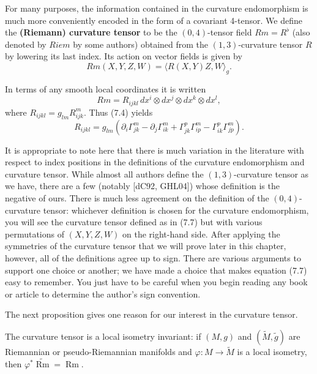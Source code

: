 For many purposes, the information contained in the curvature endomorphism is much more conveniently encoded in the form of a covariant 4-tensor. We define the \textbf{(Riemann) curvature tensor} to be the $(0,4)$-tensor field $Rm = R^\flat$ (also denoted by $Riem$ by some authors) obtained from the $(1,3)$-curvature tensor $R$ by lowering its last index. Its action on vector fields is given by
\begin{equation}
 Rm(X,Y,Z,W) = \langle R(X,Y)Z, W \rangle_g. \tag{7.7} 
\end{equation}

In terms of any smooth local coordinates it is written
\[ Rm = R_{ijkl} \, dx^i \otimes dx^j \otimes dx^k \otimes dx^l, \]
where $R_{ijkl} = g_{lm}R_{ijk}^m$. Thus (7.4) yields
\begin{equation}
 R_{ijkl} = g_{lm}(\partial_i \Gamma_{jk}^m - \partial_j \Gamma_{ik}^m + \Gamma_{jk}^p\Gamma_{ip}^m - \Gamma_{ik}^p\Gamma_{jp}^m). \tag{7.8} 
\end{equation}

It is appropriate to note here that there is much variation in the literature with respect to index positions in the definitions of the curvature endomorphism and curvature tensor. While almost all authors define the $(1,3)$-curvature tensor as we have, there are a few (notably [dC92, GHL04]) whose definition is the negative of ours. There is much less agreement on the definition of the $(0,4)$-curvature tensor: whichever definition is chosen for the curvature endomorphism, you will see the curvature tensor defined as in (7.7) but with various permutations of $(X,Y,Z,W)$ on the right-hand side. After applying the symmetries of the curvature tensor that we will prove later in this chapter, however, all of the definitions agree up to sign. There are various arguments to support one choice or another; we have made a choice that makes equation (7.7) easy to remember. You just have to be careful when you begin reading any book or article to determine the author's sign convention.

The next proposition gives one reason for our interest in the curvature tensor.

\begin{proposition}
\label{prop:curvature-isometry-invariant}
The curvature tensor is a local isometry invariant: if $(M,g)$ and $(\tilde{M},\tilde{g})$ are Riemannian or pseudo-Riemannian manifolds and $\varphi: M \to \tilde{M}$ is a local isometry, then $\varphi^*\tilde{\operatorname{Rm}} = \operatorname{Rm}$.
\end{proposition}


